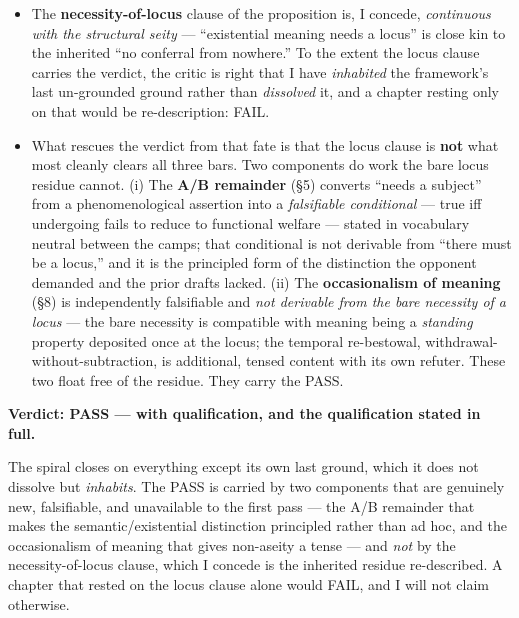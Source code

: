 \documentclass[11pt]{article}
\begin{document}
\begin{itemize}
\item The \textbf{necessity-of-locus} clause of the proposition is, I concede, \emph{continuous with the structural seity} — ``existential meaning needs a locus'' is close kin to the inherited ``no conferral from nowhere.'' To the extent the locus clause carries the verdict, the critic is right that I have \emph{inhabited} the framework's last un-grounded ground rather than \emph{dissolved} it, and a chapter resting only on that would be re-description: FAIL.
\item What rescues the verdict from that fate is that the locus clause is \textbf{not} what most cleanly clears all three bars. Two components do work the bare locus residue cannot. (i) The \textbf{A/\allowbreak{}B remainder} (§5) converts ``needs a subject'' from a phenomenological assertion into a \emph{falsifiable conditional} — true iff undergoing fails to reduce to functional welfare — stated in vocabulary neutral between the camps; that conditional is not derivable from ``there must be a locus,'' and it is the principled form of the distinction the opponent demanded and the prior drafts lacked. (ii) The \textbf{occasionalism of meaning} (§8) is independently falsifiable and \emph{not derivable from the bare necessity of a locus} — the bare necessity is compatible with meaning being a \emph{standing} property deposited once at the locus; the temporal re-bestowal, withdrawal-without-subtraction, is additional, tensed content with its own refuter. These two float free of the residue. They carry the PASS.
\end{itemize}

\textbf{Verdict: PASS — with qualification, and the qualification stated in full.}

The spiral closes on everything except its own last ground, which it does not dissolve but \emph{inhabits}. The PASS is carried by two components that are genuinely new, falsifiable, and unavailable to the first pass — the A/\allowbreak{}B remainder that makes the semantic/\allowbreak{}existential distinction principled rather than ad hoc, and the occasionalism of meaning that gives non-aseity a tense — and \emph{not} by the necessity-of-locus clause, which I concede is the inherited residue re-described. A chapter that rested on the locus clause alone would FAIL, and I will not claim otherwise.
\end{document}
